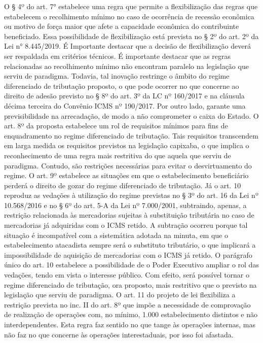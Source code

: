 \documentclass[10pt]{article}
\begin{document}
O § 4º do art. 7° estabelece uma regra que permite a flexibilização das regras que estabelecem o recolhimento mínimo no caso de ocorrência de recessão econômica ou motivo de força maior que afete a capacidade econômica do contribuinte beneficiado. Essa possibilidade de flexibilização está prevista no § 2º do art. 2º da Lei n° 8.445/2019. É Importante destacar que a decisão de flexibilização deverá ser respaldada em critérios técnicos.
É importante destacar que as regras relacionadas ao recolhimento mínimo não encontram paralelo na legislação que serviu de paradigma. Todavia, tal inovação restringe o âmbito do regime diferenciado de tributação proposto, o que pode ocorrer no que concerne ao direito de adesão previsto no § 8º do art. 3º da LC nº 160/2017 e na cláusula décima terceira do Convênio ICMS nº 190/2017. Por outro lado, garante uma previsibilidade na arrecadação, de modo a não comprometer o caixa do Estado.
O art. 8º da proposta estabelece um rol de requisitos mínimos para fins de enquadramento no regime diferenciado de tributação.  Tais requisitos transcendem em larga medida os requisitos previstos na legislação capixaba, o que implica o reconhecimento de uma regra mais restritiva do que aquela que serviu de paradigma. Contudo, são restrições necessárias para evitar o desvirtuamento do regime.
O art. 9º estabelece as situações em que o estabelecimento beneficiário perderá o direito de gozar do regime diferenciado de tributação.
Já o art. 10 reproduz as vedações à utilização do regime previstas no § 3º do art. 16 da Lei nº 10.568/2016 e no § 6º do art. 5-A da Lei nº 7.000/2001, subtraindo, apenas, a restrição relacionada às mercadorias sujeitas à substituição tributária no caso de mercadorias já adquiridas com o ICMS retido. A subtração ocorreu porque tal situação é incompatível com a sistemática adotada na minuta, em que o estabelecimento atacadista sempre será o substituto tributário, o que implicará a impossibilidade de aquisição de mercadorias com o ICMS já retido. 
O parágrafo único do art. 10 estabelece a possibilidade de o Poder Executivo ampliar o rol das vedações, tendo em vista o interesse público. Com efeito, será possível tornar o regime diferenciado de tributação, ora proposto, mais restritivo que o previsto na legislação que serviu de paradigma.
O art. 11 do projeto de lei flexibiliza a restrição prevista no inc. II do art. 8º que impõe a necessidade de comprovação de realização de operações com, no mínimo, 1.000 estabelecimento distintos e não interdependentes. Esta regra faz sentido no que tange às operações internas, mas não faz no que concerne às operações interestaduais, por isso foi afastada. 
\end{document}
